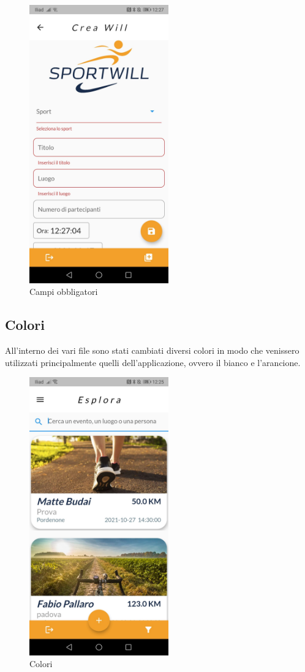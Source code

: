 \begin{figure}[htbp]	
	\centering
	\includegraphics[width=6cm]{immagini/modifica.jpeg}
	\caption{Campi obbligatori}
	\label{fig:Campi obbligatori}
\end{figure}

\newpage

\subsection{Colori}
All'interno dei vari file sono stati cambiati diversi colori in modo che venissero utilizzati principalmente quelli dell'applicazione, ovvero il bianco e l'arancione.\\

\begin{figure}[htbp]	
	\centering
	\includegraphics[width=6cm]{immagini/colori.jpeg}
	\caption{Colori}
	\label{fig:Colori}
\end{figure}


